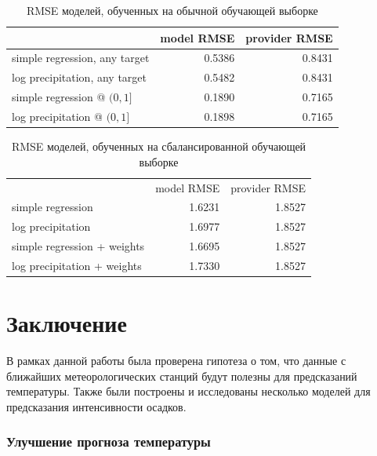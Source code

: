 \documentclass[14pt]{matmex-diploma}
\begin{document}

\begin{table}[H]
  \centering
  \begin{tabular}{ l | r | r }
     & model RMSE & provider RMSE \\ 
     \hline
    simple regression, any target &  0.5386  &  0.8431 \\ 
    log precipitation, any target &  0.5482  &  0.8431 \\ 
    simple regression @ $(0, 1]$  &  0.1890  &  0.7165 \\ 
    log precipitation @ $(0, 1]$  &  0.1898  &  0.7165 \\ 
  \end{tabular}
  \caption{RMSE моделей, обученных на обычной обучающей выборке}
  \label{table_simple_pool}
\end{table}

\begin{table}[H]
  \centering
  \begin{tabular}{ l | r | r }
     & model RMSE & provider RMSE \\ 
    simple regression             &  1.6231  &  1.8527 \\ 
    log precipitation             &  1.6977  &  1.8527 \\ 
    simple regression + weights   &  1.6695  &  1.8527 \\ 
    log precipitation + weights   &  1.7330  &  1.8527 \\ 
  \end{tabular}
  \caption{RMSE моделей, обученных на сбалансированной обучающей выборке}
  \label{table_balanced_pool}
\end{table}






\section*{Заключение}
В рамках данной работы была проверена гипотеза о том, что данные с ближайших метеорологических станций будут полезны для предсказаний температуры. Также были построены и исследованы несколько моделей для предсказания интенсивности осадков.

\subsubsection*{Улучшение прогноза температуры}
\end{document}
